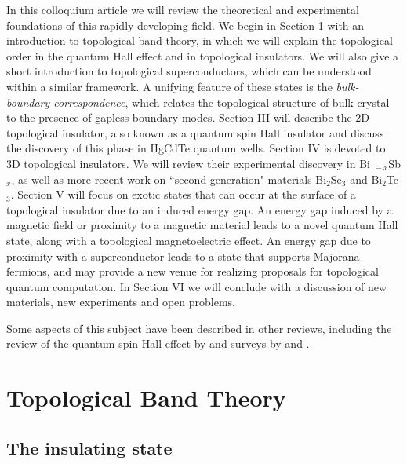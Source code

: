 \documentclass[twocolumn,floatfix,showpacs,rmp,aps]{revtex4}
\begin{document}
In this colloquium article we will review the theoretical and
experimental foundations of this rapidly developing field.  We
begin in Section \ref{sec:topobandtheory} with an introduction to
topological band theory, in which we will explain the topological
order in the quantum Hall effect and in topological insulators.
We will also give a short introduction to topological superconductors,
which can be understood within a similar framework.
A unifying feature of these states is the {\it bulk-boundary correspondence}, which
relates the topological structure of bulk crystal to the presence of gapless boundary modes.
Section III will describe the 2D topological insulator,
also known as a quantum spin Hall insulator and discuss the
discovery of this phase in HgCdTe quantum wells.
Section IV is devoted to 3D topological insulators.
We will review their experimental discovery in Bi$_{1-x}$Sb$_x$, as well as more
recent work on ``second generation" materials Bi$_2$Se$_3$ and
Bi$_2$Te$_3$.
Section V
will focus on exotic states that can occur at the surface of a topological
insulator due to an induced energy gap.  An energy gap induced by a magnetic
field or proximity to a magnetic material leads to a
novel quantum Hall state, along with a topological
magnetoelectric effect.  An energy gap due to proximity with a superconductor leads to a
state that supports Majorana fermions, and may provide a new venue
for realizing proposals for topological quantum computation.
In Section VI we will conclude with a discussion of new materials, new
experiments and open problems.

Some aspects of this subject have been described in other reviews, including
the review of the quantum spin Hall effect by \textcite{konig08} and surveys
by \textcite{qizhang10} and \textcite{moore10}.




\section{Topological Band Theory}
\label{sec:topobandtheory}

\subsection{The insulating state}
\label{sec:insulator}
\end{document}
